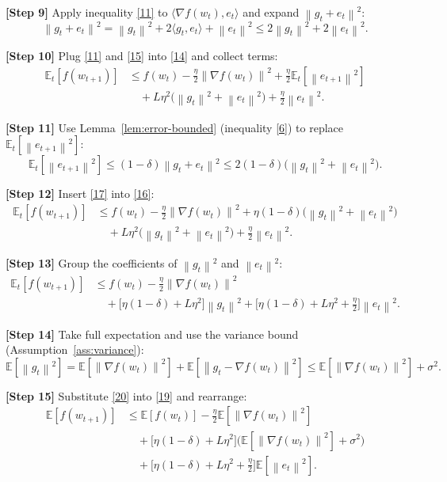 \documentclass{article}
\newcommand{\E}{\mathbb{E}}
\newcommand{\norm}[1]{\left\lVert#1\right\rVert}
\begin{document}
\noindent\textbf{[Step 9]}  Apply inequality \eqref{11} to $\langle\nabla f(w_t),e_t\rangle$ and expand $\norm{g_t+e_t}^2$:
\[
\norm{g_t+e_t}^2 = \norm{g_t}^2+2\langle g_t,e_t\rangle+\norm{e_t}^2
\le 2\norm{g_t}^2+2\norm{e_t}^2.
\tag{15}
\]

\noindent\textbf{[Step 10]}  Plug \eqref{11} and \eqref{15} into \eqref{14} and collect terms:
\[
\begin{aligned}
\E_t[f(w_{t+1})]
&\le f(w_t)
-\frac{\eta}{2}\norm{\nabla f(w_t)}^2
+\frac{\eta}{2}\E_t[\norm{e_{t+1}}^2] \\
&\quad +L\eta^2\big(\norm{g_t}^2+\norm{e_t}^2\big)
+\frac{\eta}{2}\norm{e_t}^2 .
\end{aligned}
\tag{16}
\]

\noindent\textbf{[Step 11]}  Use Lemma~\ref{lem:error-bounded} (inequality \eqref{6}) to replace $\E_t[\norm{e_{t+1}}^2]$:
\[
\E_t[\norm{e_{t+1}}^2]\le (1-\delta)\norm{g_t+e_t}^2
\le 2(1-\delta)\big(\norm{g_t}^2+\norm{e_t}^2\big).
\tag{17}
\]

\noindent\textbf{[Step 12]}  Insert \eqref{17} into \eqref{16}:
\[
\begin{aligned}
\E_t[f(w_{t+1})]
&\le f(w_t)
-\frac{\eta}{2}\norm{\nabla f(w_t)}^2
+ \eta(1-\delta)\big(\norm{g_t}^2+\norm{e_t}^2\big) \\
&\quad +L\eta^2\big(\norm{g_t}^2+\norm{e_t}^2\big)
+\frac{\eta}{2}\norm{e_t}^2 .
\end{aligned}
\tag{18}
\]

\noindent\textbf{[Step 13]}  Group the coefficients of $\norm{g_t}^2$ and $\norm{e_t}^2$:
\[
\begin{aligned}
\E_t[f(w_{t+1})]
&\le f(w_t)
-\frac{\eta}{2}\norm{\nabla f(w_t)}^2 \\
&\quad +\big[\eta(1-\delta)+L\eta^2\big]\norm{g_t}^2
+\big[\eta(1-\delta)+L\eta^2+\tfrac{\eta}{2}\big]\norm{e_t}^2 .
\end{aligned}
\tag{19}
\]

\noindent\textbf{[Step 14]}  Take full expectation and use the variance bound (Assumption~\ref{ass:variance}):
\[
\E[\norm{g_t}^2]=\E[\norm{\nabla f(w_t)}^2]+\E[\norm{g_t-\nabla f(w_t)}^2]
\le \E[\norm{\nabla f(w_t)}^2]+\sigma^2 .
\tag{20}
\]

\noindent\textbf{[Step 15]}  Substitute \eqref{20} into \eqref{19} and rearrange:
\[
\begin{aligned}
\E[f(w_{t+1})]
&\le \E[f(w_t)]
-\frac{\eta}{2}\E[\norm{\nabla f(w_t)}^2] \\
&\quad +\big[\eta(1-\delta)+L\eta^2\big]\big(\E[\norm{\nabla f(w_t)}^2]+\sigma^2\big) \\
&\quad +\big[\eta(1-\delta)+L\eta^2+\tfrac{\eta}{2}\big]\E[\norm{e_t}^2].
\end{aligned}
\tag{21}
\]
\end{document}
